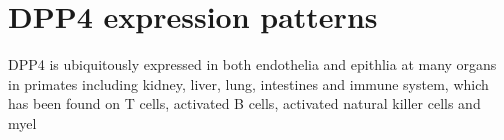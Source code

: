 \section{DPP4 expression patterns}
DPP4 is ubiquitously expressed in both endothelia and epithlia at many organs in primates including kidney, liver, lung, intestines and immune system, which has been found on T cells, activated B cells, activated natural killer cells and myel